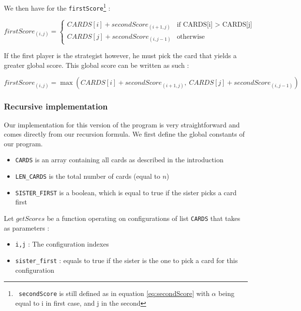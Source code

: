 \documentclass[a4paper,12pt,fleqn]{article}
\newcommand\ezskip{\medskip\noindent}
\begin{document}
We then have for the \texttt{firstScore}\footnote{\ \texttt{secondScore} is still defined as in equation \ref{eq:secondScore} with $\alpha$ being equal to i in first case, and j in the second} :

    \begin{equation}
    firstScore_{(i,j)} =    \begin{cases}
                                CARDS[i] + secondScore_{(i+1,j)} & \text{if CARDS[i] > CARDS[j]} \\
                                CARDS[j] + secondScore_{(i,j-1)} & \text{otherwise}
                            \end{cases}
    \end{equation}
    
If the first player is the strategist however, he must pick the card that yields a greater global score.
This global score can be written as such :

    \begin{equation}
    firstScore_{(i,j)} = \max \left(CARDS[i] + secondScore_{(i+1,j)}, \ 
                                    CARDS[j] + secondScore_{(i,j-1)}\right)
    \end{equation}

\subsubsection{Recursive implementation}

Our implementation for this version of the program is very straightforward and comes directly from our recursion formula. We first define the global constants of our program.

\begin{itemize}
    \item \texttt{CARDS} is an array containing all cards as described in the introduction
    \item \texttt{LEN\_CARDS} is the total number of cards (equal to $n$)
    \item \texttt{SISTER\_FIRST} is a boolean, which is equal to true if the sister picks a card first
\end{itemize}

\ezskip Let $getScores$ be a function operating on configurations of list \texttt{CARDS} that takes as parameters :

\begin{itemize}
    \item \texttt{i,j} : The configuration indexes
    \item \texttt{sister\_first} : equals to true if the sister is the one to pick a card for this configuration
\end{itemize}
\end{document}
